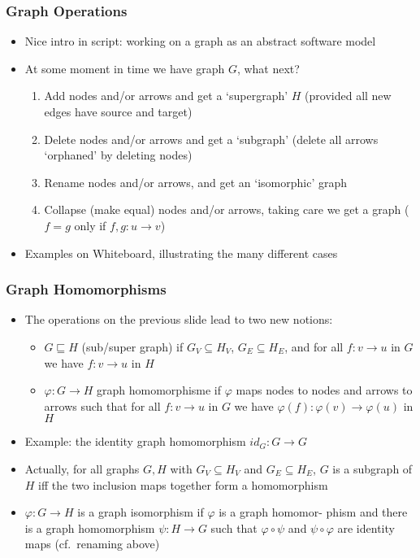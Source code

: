 \documentclass[handout]{beamer}
\begin{document}
\frame
  {   
    \frametitle{Graph Operations}\label{Ch2:GraphOps}

 \begin{itemize}[<+->]
\item Nice intro in script: working on a graph as an abstract software model
\item At some moment in time we have graph $G$, what next?
   \begin{enumerate}[<+->]
\item Add nodes and/or arrows and get a `supergraph' $H$ (provided all new edges
have source and target)
\item Delete nodes and/or arrows and get a `subgraph'
(delete all arrows `orphaned' by deleting nodes)
\item Rename nodes and/or arrows, and get an `isomorphic' graph
\item Collapse (make equal) nodes and/or arrows, taking care we get a graph
($f=g$ only if $f,g: u\to v$)
   \end{enumerate}
\item Examples on Whiteboard, illustrating the many different cases
 \end{itemize}

 }

\frame
  {   
    \frametitle{Graph Homomorphisms}\label{Ch2:GraphHoms}

 \begin{itemize}[<+->]
\item The operations on the previous slide lead to two new notions:
 \begin{itemize}[<+->]
\item $G\sqsubseteq H$ (sub/super graph) if $G_V\subseteq H_V$, $G_E\subseteq H_E$,
and for all $f: v\to u$ in $G$ we have $f: v\to u$ in $H$
\item $\varphi: G\to H$ graph homomorphisme if $\varphi$ maps nodes to nodes and arrows
to arrows such that for all $f: v\to u$ in $G$ we have $\varphi(f): \varphi(v)\to \varphi(u)$ in $H$
 \end{itemize}
\item Example: the identity graph homomorphism $id_G : G\to G$
\item Actually, for all graphs $G,H$ with $G_V \subseteq H_V$ and $G_E \subseteq H_E$, 
$G$ is a subgraph of $H$
iff the two inclusion maps together form a homomorphism
\item $\varphi: G\to H$ is a graph isomorphism if $\varphi$ is a graph
homomor- phism and there is  a graph homomorphism $\psi: H\to G$ such that
$\varphi\circ\psi$ and $\psi\circ\varphi$ are identity maps (cf.\ renaming above) 
 \end{itemize}

 }
\end{document}
